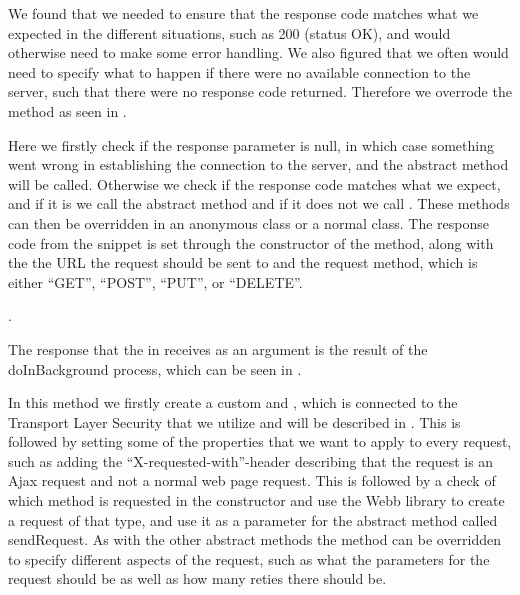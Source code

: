 We found that we needed to ensure that the response code matches what we expected in the different situations, such as 200 (status OK), and would otherwise need to make some error handling. We also figured that we often would need to specify what to happen if there were no available connection to the server, such that there were no response code returned. Therefore we overrode the  method as seen in . 


\FloatBarrier

Here we firstly check if the response parameter is null, in which case something went wrong in establishing the connection to the server, and the abstract method  will be called. Otherwise we check if the response code matches what we expect, and if it is we call the abstract method  and if it does not we call . These methods can then be overridden in an anonymous class or a normal class. The response code from the snippet is set through the constructor of the method, along with the the URL the request should be sent to and the request method, which is either ``GET'', ``POST'', ``PUT'', or ``DELETE''. 

.

The response that the  in  receives as an argument is the result of the doInBackground process, which can be seen in . 


\FloatBarrier

In this method we firstly create a custom  and , which is connected to the Transport Layer Security that we utilize and will be described in . This is followed by setting some of the properties that we want to apply to every request, such as adding the ``X-requested-with''-header describing that the request is an Ajax request and not a normal web page request. This is followed by a check of which method is requested in the constructor and use the Webb library to create a request of that type, and use it as a parameter for the abstract method called sendRequest. As with the other abstract methods the  method can be overridden to specify different aspects of the request, such as what the parameters for the request should be as well as how many reties there should be.